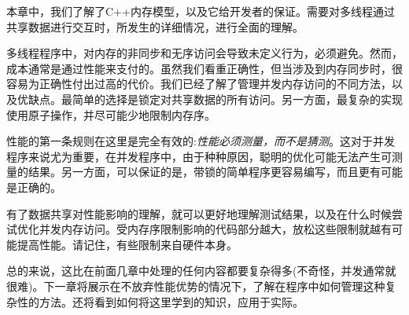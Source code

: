 本章中，我们了解了C++内存模型，以及它给开发者的保证。需要对多线程通过共享数据进行交互时，所发生的详细情况，进行全面的理解。

多线程程序中，对内存的非同步和无序访问会导致未定义行为，必须避免。然而，成本通常是通过性能来支付的。虽然我们看重正确性，但当涉及到内存同步时，很容易为正确性付出过高的代价。我们已经了解了管理并发内存访问的不同方法，以及优缺点。最简单的选择是锁定对共享数据的所有访问。另一方面，最复杂的实现使用原子操作，并尽可能少地限制内存序。

性能的第一条规则在这里是完全有效的:\textit{性能必须测量，而不是猜测}。这对于并发程序来说尤为重要，在并发程序中，由于种种原因，聪明的优化可能无法产生可测量的结果。另一方面，可以保证的是，带锁的简单程序更容易编写，而且更有可能是正确的。

有了数据共享对性能影响的理解，就可以更好地理解测试结果，以及在什么时候尝试优化并发内存访问。受内存序限制影响的代码部分越大，放松这些限制就越有可能提高性能。请记住，有些限制来自硬件本身。

总的来说，这比在前面几章中处理的任何内容都要复杂得多(不奇怪，并发通常就很难)。下一章将展示在不放弃性能优势的情况下，了解在程序中如何管理这种复杂性的方法。还将看到如何将这里学到的知识，应用于实际。





